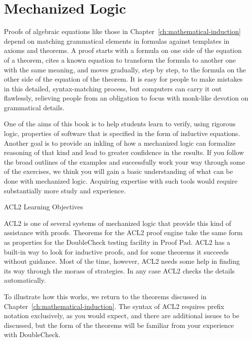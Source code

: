 \chapter{Mechanized Logic}
\label{ch:mechanized-logic}

Proofs of algebraic equations
like those in Chapter~\ref{ch:mathematical-induction}
depend on matching grammatical elements in formulas
against templates in axioms and theorems.
A proof starts with a formula on one side
of the equation of a theorem,
cites a known equation to transform the formula
to another one with the same meaning,
and moves gradually, step by step, to the formula
on the other side of the equation of the theorem.
It is easy for people to make mistakes
in this detailed, syntax-matching process,
but computers can carry it out flawlessly,
relieving people from an obligation to focus
with monk-like devotion on grammatical details.

\begin{aside}
One of the aims of this book is to help students learn to
verify, using rigorous logic, properties of software
that is specified in the form of inductive equations.
Another goal is to provide
an inkling of how a mechanized logic
can formalize reasoning of that kind
and lead to greater confidence in the results.
If you follow the broad outlines of the examples
and successfully work your way through some of the exercises,
we think you will gain a basic understanding
of what can be done with mechanized logic.
Acquiring expertise with such tools
would require substantially more study and experience.
\caption{ACL2 Learning Objectives}
\label{aside:acl2-learning-objectives}
\end{aside}

ACL2 is one of several systems of
mechanized logic
that provide this kind of assistance with proofs.
Theorems for the ACL2 proof engine take the same form
as properties for the DoubleCheck testing facility in Proof Pad.
ACL2 has a built-in way to look for inductive proofs,
and for some theorems it succeeds without guidance.
Most of the time, however, ACL2 needs some help in
finding its way through the morass of strategies.
In any case ACL2 checks the details automatically.

To illustrate how this works, we return to the theorems
discussed in Chapter~\ref{ch:mathematical-induction}.
The syntax of ACL2 requires prefix notation exclusively,
as you would expect, and there are additional issues
to be discussed, but the form of the theorems
will be familiar from your experience with DoubleCheck.

